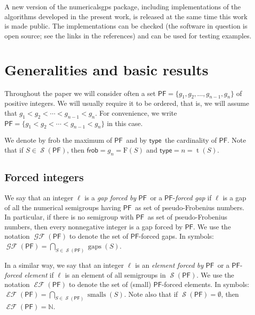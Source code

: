 \documentclass[11pt]{amsart}
\theoremstyle{remark}
\begin{document}
A new version of the \textsf{numericalsgps} package, including implementations of the algorithms developed in the present work, is released at the same time this work is made public. The implementations can be checked (the software in question is open source; see the links in the references) and can be used for testing examples.

\section{Generalities and basic results}
\label{sec:generalities}
Throughout the paper we will consider often a set ${\ensuremath{\mathsf{PF}}}= \{g_1,g_2,\ldots,g_{n-1},g_n\}$ of positive integers. We will usually require it to be ordered, that is, we will assume that $g_1<g_2<\cdots <g_{n-1}<g_n$. 
For convenience, we write  ${\ensuremath{\mathsf{PF}}}= \{g_1<g_2<\cdots <g_{n-1}<g_n\}$ in this case.

We denote by \textsf{frob} the maximum of {\ensuremath{\mathsf{PF}}}\ and by {\ensuremath{\mathsf{type}}}\ the cardinality of {\ensuremath{\mathsf{PF}}}. Note that if $S\in \operatorname{\mathcal{S}}({\ensuremath{\mathsf{PF}}})$, then ${\ensuremath{\mathsf{frob}}}=g_n=\mathrm{F}(S)$ and ${\ensuremath{\mathsf{type}}}=n=\operatorname{t}(S)$.

\subsection{Forced integers}
\label{subsec:forced_integers}
We say that an integer $\ell$ is a \emph{gap forced by} {\ensuremath{\mathsf{PF}}}\ or a {\ensuremath{\mathsf{PF}}}-\emph{forced gap} if $\ell$ is a gap of all the numerical semigroups having {\ensuremath{\mathsf{PF}}}\ as set of pseudo-Frobenius numbers. In particular, if there is no semigroup with {\ensuremath{\mathsf{PF}}}\ as set of pseudo-Frobenius numbers, then every nonnegative integer is a gap forced by {\ensuremath{\mathsf{PF}}}. We use the notation $\operatorname{\mathcal{GF}}({\ensuremath{\mathsf{PF}}})$ to denote the set of {\ensuremath{\mathsf{PF}}}-forced gaps. 
In symbols: $\operatorname{\mathcal{GF}}({\ensuremath{\mathsf{PF}}})= \bigcap_{S\in \operatorname{\mathcal{S}}({\ensuremath{\mathsf{PF}}})}\operatorname{gaps}(S)$.

In a similar way, we say that an integer $\ell$ is an \emph{element forced by} {\ensuremath{\mathsf{PF}}}\ or a
{\ensuremath{\mathsf{PF}}}-\emph{forced element} if $\ell$ is an element of all semigroups in $\operatorname{\mathcal{S}}({\ensuremath{\mathsf{PF}}})$. We use the notation $\operatorname{\mathcal{EF}}({\ensuremath{\mathsf{PF}}})$ to denote the set of (small) {\ensuremath{\mathsf{PF}}}-forced elements. 
In symbols: $\operatorname{\mathcal{EF}}({\ensuremath{\mathsf{PF}}})= \bigcap_{S\in \operatorname{\mathcal{S}}({\ensuremath{\mathsf{PF}}})}\operatorname{smalls}(S)$. Note also that if $\operatorname{\mathcal{S}}({\ensuremath{\mathsf{PF}}})=\emptyset$, then $\operatorname{\mathcal{EF}}({\ensuremath{\mathsf{PF}}}) = \mathbb{N}$.
\end{document}

